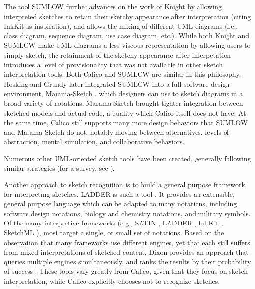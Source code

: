 The tool SUMLOW \citep{chen2008sumlow} further advances on the work of Knight by allowing interpreted sketches to retain their sketchy appearance after interpretation (citing InkKit as inspiration), and allows the mixing of different UML diagrams (i.e., class diagram, sequence diagram, use case diagram, etc.). While both Knight and SUMLOW make UML diagrams a less viscous representation by allowing users to simply sketch, the retainment of the sketchy appearance after interpetation introduces a level of provisionality that was not available in other sketch interpretation tools. Both Calico and SUMLOW are similar in this philosophy. Hosking and Grundy later integrated SUMLOW into a full software design environment, Marama-Sketch \citep{Grundy}, which designers can use to sketch diagrams in a broad variety of notations. Marama-Sketch brought tighter integration between sketched models and actual code, a quality which Calico itself does not have. At the same time, Calico still supports many more design behaviors that SUMLOW and Marama-Sketch do not, notably moving between alternatives, levels of abstraction, mental simulation, and collaborative behaviors.

Numerous other UML-oriented sketch tools have been created, generally following similar strategies (for a survey, see \citep{Johnson}). 

Another approach to sketch recognition is to build a general purpose framework for interpreting sketches. LADDER is such a tool \cite{hammond2006ladder}. It provides an extensible, general purpose language which can be adapted to many notations, including software design notations, biology and chemistry notations, and military symbols. Of the many interpretive frameworks (e.g., SATIN \cite{Hong}, LADDER \cite{hammond2006ladder}, InkKit \cite{Plimmer}, SketchML \citep{Avola2009}), most target a single, or small set of notations. Based on the observation that many frameworks use different engines, yet that each still suffers from mixed interpretations of sketched content, Dixon provides an approach that queries multiple engines simultaneously, and ranks the results by their probability of success \cite{dixon2008whiteboards}. These tools vary greatly from Calico, given that they focus on sketch interpretation, while Calico explicitly chooses not to recognize sketches.

